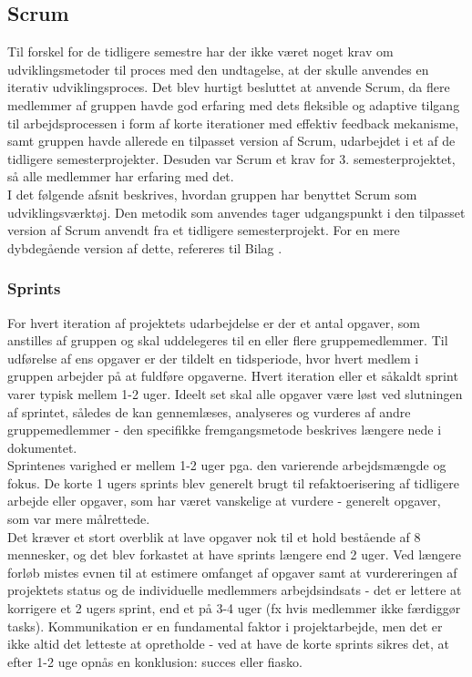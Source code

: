 \documentclass[a4paper,12pt,fleqn,oneside]{article}
\begin{document}
\subsection{Scrum}
Til forskel for de tidligere semestre har der ikke været noget krav om udviklingsmetoder til proces med den undtagelse, at der skulle anvendes en iterativ udviklingsproces. Det blev hurtigt besluttet at anvende Scrum, da flere medlemmer af gruppen havde god erfaring med dets fleksible og adaptive tilgang til arbejdsprocessen i form af korte iterationer med effektiv feedback mekanisme, samt gruppen havde allerede en tilpasset version af Scrum, udarbejdet i et af de tidligere semesterprojekter. Desuden var Scrum et krav for 3. semesterprojektet, så alle medlemmer har erfaring med det. \\
I det følgende afsnit beskrives, hvordan gruppen har benyttet Scrum som udviklingsværktøj. Den metodik som anvendes tager udgangspunkt i den tilpasset version af Scrum anvendt fra et tidligere semesterprojekt. For en mere dybdegående version af dette, refereres til Bilag \cite{Scrum}.

\subsubsection{Sprints}
For hvert iteration af projektets udarbejdelse er der et antal opgaver, som anstilles af gruppen og skal uddelegeres til en eller flere gruppemedlemmer. Til udførelse af ens opgaver er der tildelt en tidsperiode, hvor hvert medlem i gruppen arbejder på at fuldføre opgaverne. Hvert iteration eller et såkaldt sprint varer typisk mellem 1-2 uger. Ideelt set skal alle opgaver være løst ved slutningen af sprintet, således de kan gennemlæses, analyseres og vurderes af andre gruppemedlemmer - den specifikke fremgangsmetode beskrives længere nede i dokumentet. \\
Sprintenes varighed er mellem 1-2 uger pga. den varierende arbejdsmængde og fokus. De korte 1 ugers sprints blev generelt brugt til refaktoerisering af tidligere arbejde eller opgaver, som har været vanskelige at vurdere - generelt opgaver, som var mere målrettede. \\
Det kræver et stort overblik at lave opgaver nok til et hold bestående af 8 mennesker, og det blev forkastet at have sprints længere end 2 uger. Ved længere forløb mistes evnen til at estimere omfanget af opgaver samt at vurdereringen af projektets status og de individuelle medlemmers arbejdsindsats - det er lettere at korrigere et 2 ugers sprint, end et på 3-4 uger (fx hvis medlemmer ikke færdiggør tasks). Kommunikation er en fundamental faktor i projektarbejde, men det er ikke altid det letteste at opretholde - ved at have de korte sprints sikres det, at efter 1-2 uge opnås en konklusion: succes eller fiasko. 
\end{document}
